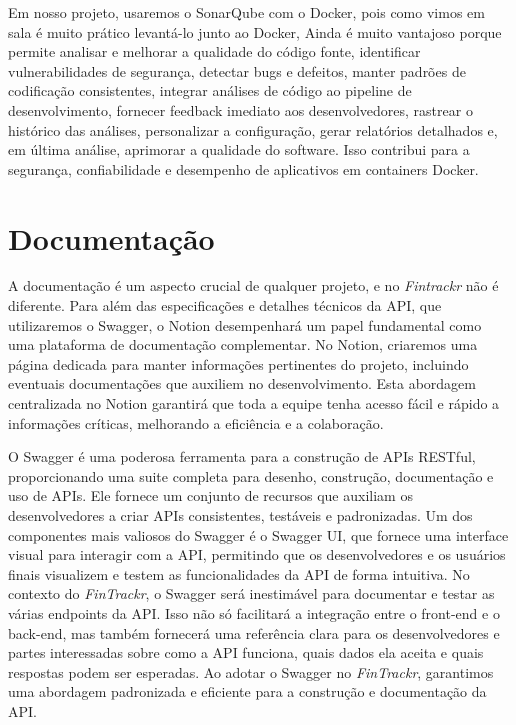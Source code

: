 \par Em nosso projeto, usaremos o SonarQube com o Docker, pois como vimos em sala é muito prático levantá-lo junto ao Docker, Ainda é muito  vantajoso porque permite analisar e melhorar a qualidade do código fonte, identificar vulnerabilidades de segurança, detectar bugs e defeitos, manter padrões de codificação consistentes, integrar análises de código ao pipeline de desenvolvimento, fornecer feedback imediato aos desenvolvedores, rastrear o histórico das análises, personalizar a configuração, gerar relatórios detalhados e, em última análise, aprimorar a qualidade do software. Isso contribui para a segurança, confiabilidade e desempenho de aplicativos em containers Docker.

\section{Documentação}

A documentação é um aspecto crucial de qualquer projeto, e no \textit{Fintrackr} não é diferente. Para além das especificações e detalhes técnicos da API, que utilizaremos o Swagger, o Notion desempenhará um papel fundamental como uma plataforma de documentação complementar. No Notion, criaremos uma página dedicada para manter informações pertinentes do projeto, incluindo eventuais documentações que auxiliem no desenvolvimento. Esta abordagem centralizada no Notion garantirá que toda a equipe tenha acesso fácil e rápido a informações críticas, melhorando a eficiência e a colaboração.

O Swagger é uma poderosa ferramenta para a construção de APIs RESTful, proporcionando uma suite completa para desenho, construção, documentação e uso de APIs. Ele fornece um conjunto de recursos que auxiliam os desenvolvedores a criar APIs consistentes, testáveis e padronizadas. Um dos componentes mais valiosos do Swagger é o Swagger UI, que fornece uma interface visual para interagir com a API, permitindo que os desenvolvedores e os usuários finais visualizem e testem as funcionalidades da API de forma intuitiva. No contexto do \textit{FinTrackr}, o Swagger será inestimável para documentar e testar as várias endpoints da API. Isso não só facilitará a integração entre o front-end e o back-end, mas também fornecerá uma referência clara para os desenvolvedores e partes interessadas sobre como a API funciona, quais dados ela aceita e quais respostas podem ser esperadas. Ao adotar o Swagger no \textit{FinTrackr}, garantimos uma abordagem padronizada e eficiente para a construção e documentação da API.
